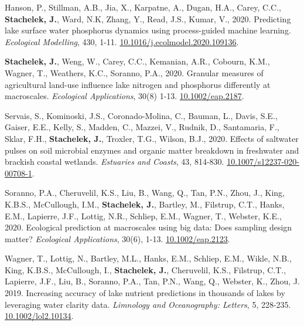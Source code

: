 \documentclass[11pt]{article}
\makeatletter
\newlength{\bibhang}
\newlength{\bibsep}
 {\@listi \global\bibsep\itemsep \global\advance\bibsep by\parsep}
\newenvironment{bibenum*}
  {\renewcommand\labelenumi{[\theenumi]}%
   \etaremune[
     topsep=0pt,
     itemsep=\bibsep,
     parsep=0pt,partopsep=0pt,
     itemindent=-\bibhang,
     leftmargin={\bibhang+\widthof{[999]}}]}
  {\endetaremune}
\makeatother
\begin{document}
\begin{bibenum*}

\item Hanson, P., Stillman, A.B., Jia, X., Karpatne, A., Dugan, H.A., Carey, C.C., \textbf{Stachelek, J.}, Ward, N.K, Zhang, Y., Read, J.S., Kumar, V., 2020. Predicting lake surface water phosphorus dynamics using process-guided machine learning. \emph{Ecological Modelling}, 430, 1-11. \href{https://doi.org/10.1016/j.ecolmodel.2020.109136}{10.1016/j.ecolmodel.2020.109136}.

\item \textbf{Stachelek, J.}, Weng, W., Carey, C.C., Kemanian, A.R., Cobourn, K.M., Wagner, T., Weathers, K.C., Soranno, P.A., 2020. Granular measures of agricultural land-use influence lake nitrogen and phosphorus differently at macroscales. \emph{Ecological Applications}, 30(8) 1-13. \href{https://doi.org/10.1002/eap.2187}{10.1002/eap.2187}.

\item Servais, S., Kominoski, J.S., Coronado-Molina, C., Bauman, L., Davis, S.E., Gaiser, E.E., Kelly, S., Madden, C., Mazzei, V., Rudnik, D., Santamaria, F., Sklar, F.H., \textbf{Stachelek, J.}, Troxler, T.G., Wilson, B.J., 2020. Effects of saltwater pulses on soil microbial enzymes and organic matter breakdown in freshwater and brackish coastal wetlands. \emph{Estuaries and Coasts}, 43, 814-830. \href{https://doi.org/10.1007/s12237-020-00708-1}{10.1007/s12237-020-00708-1}.

\item Soranno, P.A., Cheruvelil, K.S., Liu, B., Wang, Q., Tan, P.N., Zhou, J., King, K.B.S., McCullough, I.M., \textbf{Stachelek, J.}, Bartley, M., Filstrup, C.T., Hanks, E.M., Lapierre, J.F., Lottig, N.R., Schliep, E.M., Wagner, T., Webster, K.E., 2020. Ecological prediction at macroscales using big data: Does sampling design matter? \emph{Ecological Applications}, 30(6), 1-13. \href{https://doi.org/10.1002/eap.2123}{10.1002/eap.2123}.

\item Wagner, T., Lottig, N., Bartley, M.L., Hanks, E.M., Schliep, E.M., Wikle, N.B., King, K.B.S., McCullough, I., \textbf{Stachelek, J.}, Cheruvelil, K.S., Filstrup, C.T., Lapierre, J.F., Liu, B., Soranno, P.A., Tan, P.N., Wang, Q., Webster, K.,  Zhou, J. 2019. Increasing accuracy of lake nutrient predictions in thousands of lakes by leveraging water clarity data. \emph{Limnology and Oceanography: Letters}, 5, 228-235. \href{https://doi.org/10.1002/lol2.10134}{10.1002/lol2.10134}. 


\end{bibenum*}
\end{document}
